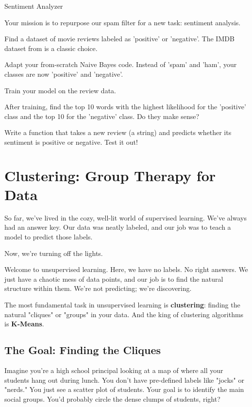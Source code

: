 \documentclass[11pt, letterpaper, openany]{book}
\begin{document}
\begin{challengebox}
Sentiment Analyzer

Your mission is to repurpose our spam filter for a new task: sentiment analysis.

Find a dataset of movie reviews labeled as 'positive' or 'negative'. The IMDB dataset from is a classic choice.

Adapt your from-scratch Naive Bayes code. Instead of 'spam' and 'ham', your classes are now 'positive' and 'negative'.

Train your model on the review data.

After training, find the top 10 words with the highest likelihood for the 'positive' class and the top 10 for the 'negative' class. Do they make sense?

Write a function that takes a new review (a string) and predicts whether its sentiment is positive or negative. Test it out!
\end{challengebox}

\chapter{Clustering: Group Therapy for Data}

So far, we've lived in the cozy, well-lit world of supervised learning. We've always had an answer key. Our data was neatly labeled, and our job was to teach a model to predict those labels.

Now, we're turning off the lights.

Welcome to unsupervised learning. Here, we have no labels. No right answers. We just have a chaotic mess of data points, and our job is to find the natural structure within them. We're not predicting; we're discovering.

The most fundamental task in unsupervised learning is \textbf{clustering}: finding the natural "cliques" or "groups" in your data. And the king of clustering algorithms is \textbf{K-Means}.

\section{The Goal: Finding the Cliques}

Imagine you're a high school principal looking at a map of where all your students hang out during lunch. You don't have pre-defined labels like "jocks" or "nerds." You just see a scatter plot of students. Your goal is to identify the main social groups. You'd probably circle the dense clumps of students, right?
\end{document}
